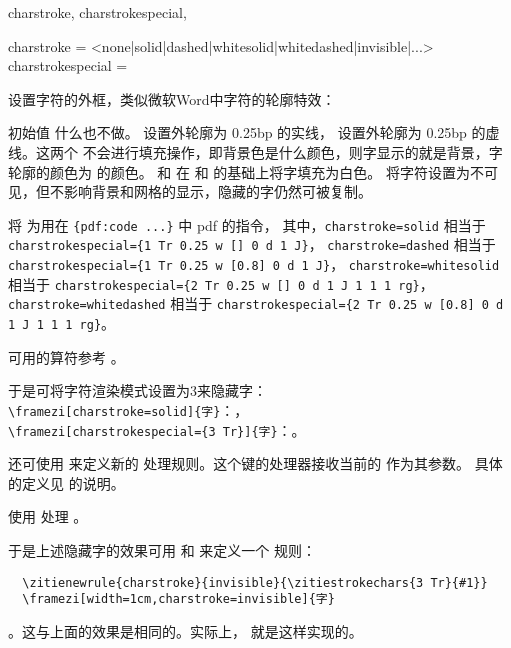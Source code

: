 \documentclass{ctxdoc}
\begin{document}
\begin{function}{
  charstroke,
  charstrokespecial,
  \zitiestrokechars
}
  \begin{syntax}
    charstroke = <none|solid|dashed|whitesolid|whitedashed|invisible|...> 
    charstrokespecial = 
      
  \end{syntax}
  设置字符的外框，类似微软Word中字符的轮廓特效：

  初始值  什么也不做。 设置外轮廓为 0.25bp 的实线， 设置外轮廓为 0.25bp 的虚线。这两个
  不会进行填充操作，即背景色是什么颜色，则字显示的就是背景，字轮廓的颜色为  的颜色。 和
   在  和  的基础上将字填充为白色。 将字符设置为不可见，但不影响背景和网格的显示，隐藏的字仍然可被复制。

   将  为用在 \verb|{pdf:code ...}| 中 pdf 的指令，
  其中，\verb|charstroke=solid| 相当于 \verb|charstrokespecial={1 Tr 0.25 w [] 0 d 1 J}|，
  \verb|charstroke=dashed| 相当于 \verb|charstrokespecial={1 Tr 0.25 w [0.8] 0 d 1 J}|，
  \verb|charstroke=whitesolid| 相当于 \verb|charstrokespecial={2 Tr 0.25 w [] 0 d 1 J 1 1 1 rg}|，
  \verb|charstroke=whitedashed| 相当于 \verb|charstrokespecial={2 Tr 0.25 w [0.8] 0 d 1 J 1 1 1 rg}|。
  
   可用的算符参考 \cite{pdfreference}。
\end{function}
  
于是可将字符渲染模式设置为3来隐藏字：\\
\verb|\framezi[charstroke=solid]{字}|：， \\
\verb|\framezi[charstrokespecial={3 Tr}]{字}|：。

还可使用  来定义新的  处理规则。这个键的处理器接收当前的  作为其参数。
具体的定义见  的说明。

 使用  处理 。
  
于是上述隐藏字的效果可用  和  来定义一个  规则：
\begin{verbatim}
  \zitienewrule{charstroke}{invisible}{\zitiestrokechars{3 Tr}{#1}}
  \framezi[width=1cm,charstroke=invisible]{字}
\end{verbatim}
  。这与上面的效果是相同的。实际上， 就是这样实现的。
\end{document}
